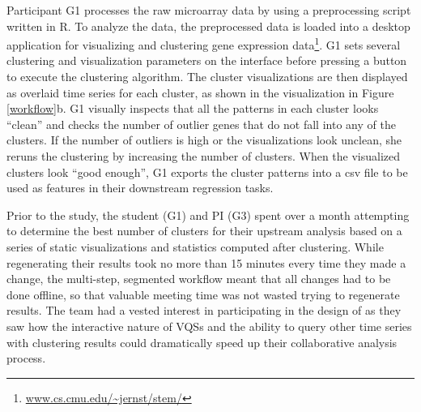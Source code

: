  Participant G1 processes the raw microarray data by using a preprocessing script written in R. To analyze the data, the preprocessed data is loaded into a desktop application for visualizing and clustering gene expression data\footnote{ \url{www.cs.cmu.edu/~jernst/stem/}}. G1 sets several clustering and visualization parameters on the interface before pressing a button to execute the clustering algorithm. The cluster visualizations are then displayed as overlaid time series for each cluster, as shown in the visualization in Figure \ref{workflow}b. G1 visually inspects that all the patterns in each cluster looks ``clean'' and checks the number of outlier genes that do not fall into any of the clusters.  If the number of outliers is high or the visualizations look unclean, she reruns the clustering by increasing the number of clusters. When the visualized clusters look ``good enough'', G1 exports the cluster patterns into a csv file to be used as features in their downstream regression tasks.
\par Prior to the study, the student (G1) and PI (G3) spent over a month attempting to determine the best number of clusters for their upstream analysis based on a series of static visualizations and statistics computed after clustering. While regenerating their results took no more than 15 minutes every time they made a change, the multi-step, segmented workflow meant that all changes had to be done offline, so that valuable meeting time was not wasted trying to regenerate results. The team had a vested interest in participating in the design of \zv as they saw how the interactive nature of VQSs and the ability to query other time series with clustering results could dramatically speed up their collaborative analysis process. 

